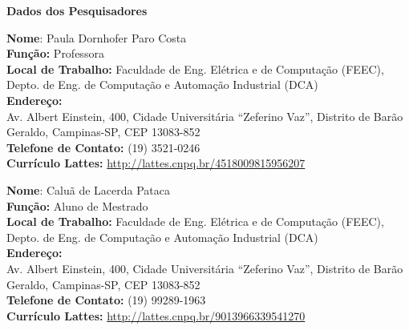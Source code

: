 \documentclass[a4paper,11pt,titlepage,singlespacing]{article}
\begin{document}

\begin{titlepage}
\begin{center}
\Large{\textbf{Dados dos Pesquisadores}}\\
\end{center}

\vspace{10pt}
\begin{flushleft}
\large{\textbf{Nome}: Paula Dornhofer Paro Costa}\\
\large{\textbf{Função:} Professora}\\
\large{\textbf{Local de Trabalho:} Faculdade de Eng. Elétrica e de Computação (FEEC), Depto. de Eng. de Computação e Automação Industrial (DCA)}\\
\large{\textbf{Endereço:} \\Av. Albert Einstein, 400, Cidade Universitária ``Zeferino Vaz'', Distrito de Barão Geraldo, Campinas-SP, CEP 13083-852}\\
\large{\textbf{Telefone de Contato:} (19) 3521-0246 }\\
\large{\textbf{Currículo Lattes:} \url{http://lattes.cnpq.br/4518009815956207} }\\
\end{flushleft}

\vspace{10pt}

\begin{flushleft}
\large{\textbf{Nome}: Caluã de Lacerda Pataca }\\
\large{\textbf{Função:} Aluno de Mestrado}\\
\large{\textbf{Local de Trabalho:} Faculdade de Eng. Elétrica e de Computação (FEEC), Depto. de Eng. de Computação e Automação Industrial (DCA)}\\
\large{\textbf{Endereço:} \\Av. Albert Einstein, 400, Cidade Universitária ``Zeferino Vaz'', Distrito de Barão Geraldo, Campinas-SP, CEP 13083-852}\\
\large{\textbf{Telefone de Contato:} (19) 99289-1963 }\\
\large{\textbf{Currículo Lattes:} \url{http://lattes.cnpq.br/9013966339541270} }\\
\end{flushleft}
\vspace{10pt}

\vspace{10pt}

\end{titlepage}
\end{document}
